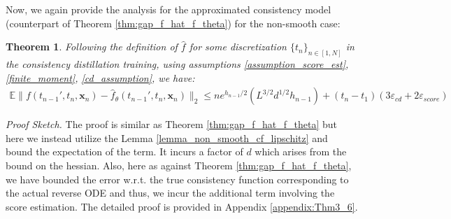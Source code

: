 \documentclass[11pt]{article}
\def\rvx{{\mathbf{x}}}
\newcommand{\E}{\mathbb{E}}
\newtheorem{theorem}[lemma]{Theorem}
\begin{document}
\noindent
Now, we again provide the analysis for the approximated consistency model (counterpart of Theorem \ref{thm:gap_f_hat_f_theta}) for the non-smooth case:
\begin{theorem}
\label{3.8thm_gap_f_non_smooth}
Following the definition of $\hat{f}$ for some discretization $\{t_n\}_{n\in [1,N]}$ in the consistency distillation training, 
using assumptions \ref{assumption_score_est}, \ref{finite_moment}, \ref{cd_assumption}, we have:
\begin{align*}
\E  
  \|
  f(t_{n-1}',t_n,{\rvx}_n)-\hat{f}_\theta(t_{n-1}',t_n,{\rvx}_n)\|_2 \leq ne^{{h_{n-1}}/{2}}(L^{{3}/{2}}d^{{1}/{2}}h_{n-1}) + (t_n-t_1)\left(3\varepsilon_{cd} +2\varepsilon_{score} \right)
\end{align*}

\end{theorem}
   \textit{Proof Sketch.} The proof is similar as Theorem \ref{thm:gap_f_hat_f_theta} but here we instead utilize the Lemma \ref{lemma_non_smooth_cf_lipschitz} and bound the expectation of the term. It incurs a factor of $d$ which arises from the bound on the hessian. Also, here as against Theorem \ref{thm:gap_f_hat_f_theta}, we have bounded the error w.r.t. the true consistency function corresponding to the actual reverse ODE and thus, we incur the additional term involving the score estimation.
    The detailed proof is provided in Appendix \ref{appendix:Thm3_6}. 
% 
% 
\end{document}
